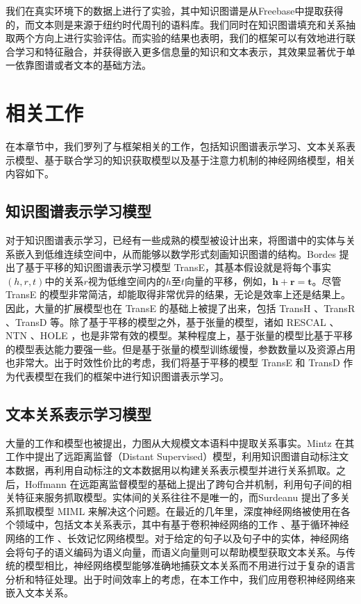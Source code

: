 我们在真实环境下的数据上进行了实验，其中知识图谱是从Freebase中提取获得的，而文本则是来源于纽约时代周刊的语料库。我们同时在知识图谱填充和关系抽取两个方向上进行实验评估。而实验的结果也表明，我们的框架可以有效地进行联合学习和特征融合，并获得嵌入更多信息量的知识和文本表示，其效果显著优于单一依靠图谱或者文本的基础方法。

\section{相关工作}

在本章节中，我们罗列了与框架相关的工作，包括知识图谱表示学习、文本关系表示模型、基于联合学习的知识获取模型以及基于注意力机制的神经网络模型，相关内容如下。

\subsection{知识图谱表示学习模型} 

对于知识图谱表示学习，已经有一些成熟的模型被设计出来，将图谱中的实体与关系嵌入到低维连续空间中，从而能够以数学形式刻画知识图谱的结构。Bordes \cite{bordes2013translating} 提出了基于平移的知识图谱表示学习模型 TransE，其基本假设就是将每个事实$(h, r, t)$中的关系$r$视为低维空间内的$ h$至$t$向量的平移，例如，$\textbf{h} + \textbf{r} = \textbf{t}$。尽管 TransE 的模型非常简洁，却能取得非常优异的结果，无论是效率上还是结果上。因此，大量的扩展模型也在 TransE 的基础上被提了出来，包括 TransH \cite{wang2014transh}、TransR \cite{lin2015learning}、TransD \cite{ji2015knowledge}等。除了基于平移的模型之外，基于张量的模型，诸如 RESCAL \cite{nickel2011three}、NTN \cite{socher2013reasoning}、HOLE \cite{nickel2016holographic}，也是非常有效的模型。某种程度上，基于张量的模型比基于平移的模型表达能力要强一些。但是基于张量的模型训练缓慢，参数数量以及资源占用也非常大。出于时效性价比的考虑，我们将基于平移的模型 TransE 和 TransD 作为代表模型在我们的框架中进行知识图谱表示学习。

\subsection{文本关系表示学习模型}

大量的工作和模型也被提出，力图从大规模文本语料中提取关系事实。Mintz \cite{mintz2009distant} 在其工作中提出了远距离监督（Distant Supervised）模型，利用知识图谱自动标注文本数据，再利用自动标注的文本数据用以构建关系表示模型并进行关系抓取。之后，Hoffmann \cite{hoffmann2011knowledge} 在远距离监督模型的基础上提出了跨句合并机制，利用句子间的相关特征来服务抓取模型。实体间的关系往往不是唯一的，而Surdeanu \cite{surdeanu2012multi} 提出了多关系抓取模型 MIML 来解决这个问题。在最近的几年里，深度神经网络被使用在各个领域中，包括文本关系表示，其中有基于卷积神经网络的工作 \cite{zeng2014relation,zeng2015distant}、基于循环神经网络的工作 \cite{zhang2015relation}、长效记忆网络模型\cite{xu2015classifying,miwa2016end}。对于给定的句子以及句子中的实体，神经网络会将句子的语义编码为语义向量，而语义向量则可以帮助模型获取文本关系。与传统的模型相比，神经网络模型能够准确地捕获文本关系而不用进行过于复杂的语言分析和特征处理。出于时间效率上的考虑，在本工作中，我们应用卷积神经网络来嵌入文本关系。


